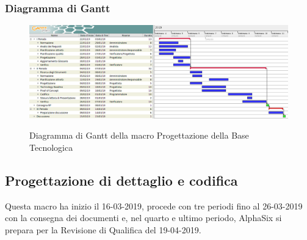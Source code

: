         \begin{landscape}
			\subsubsection{Diagramma di Gantt}        
			\begin{figure}[H]
					\centering
					\includegraphics[scale=0.49]{img/Progettazione_della_base_tecnologica.png}\\
					\caption{Diagramma di Gantt della macro Progettazione della Base Tecnologica}
			\end{figure}
		\end{landscape}
		\newpage

        \subsection{Progettazione di dettaglio e codifica}
        Questa macro ha inizio il 16-03-2019, procede con tre periodi fino al 26-03-2019 con la consegna dei documenti e, nel
        quarto e ultimo periodo, AlphaSix si prepara per la Revisione di Qualifica del 19-04-2019.
        
